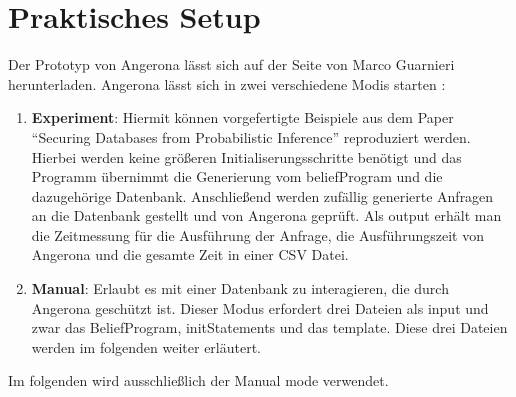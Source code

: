 \documentclass[german,version-2020-11]{uzl-thesis}
\begin{document}
\section{Praktisches Setup} \label{2.2}
Der Prototyp von Angerona lässt sich auf der Seite von Marco Guarnieri \cite{6} herunterladen. Angerona lässt sich in zwei verschiedene Modis starten :
\begin{enumerate}
	\item \textbf{Experiment}: Hiermit können vorgefertigte Beispiele aus dem Paper \enquote{Securing Databases from Probabilistic Inference}\cite{6} reproduziert werden. Hierbei werden keine größeren Initialiserungsschritte benötigt und das Programm übernimmt die Generierung vom beliefProgram und die dazugehörige Datenbank. Anschließend werden zufällig generierte Anfragen an die Datenbank gestellt und von Angerona geprüft. Als output erhält man die Zeitmessung für die Ausführung der Anfrage, die Ausführungszeit von Angerona und die gesamte Zeit in einer CSV Datei.
	\item \textbf{Manual}: Erlaubt es mit einer Datenbank zu interagieren, die durch Angerona geschützt ist. Dieser Modus erfordert drei Dateien als input und zwar das BeliefProgram, initStatements und das template. Diese drei Dateien werden im folgenden weiter erläutert.
\end{enumerate}
Im folgenden wird ausschließlich der Manual mode verwendet.
\end{document}
